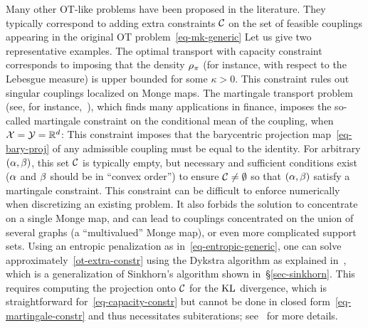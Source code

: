 Many other OT-like problems have been proposed in the literature. They typically correspond to adding extra constraints $\mathcal{C}$ on the set of feasible couplings appearing in the original OT problem~\eqref{eq-mk-generic}
Let us give two representative examples.
%
The optimal transport with capacity constraint~\citep{km1} corresponds to imposing that the density $\rho_{\pi}$ (for instance, with respect to the Lebesgue measure) is upper bounded
\eql{\label{eq-capacity-constr}
	\Cc = \enscond{ \pi }{ \density{\pi} \leq \kappa }
}
for some $\kappa>0$. This constraint rules out singular couplings localized on Monge maps. 
%
The martingale transport problem (see, for instance,~\citet{GalichonMartingale,dolinsky2014martingale,TanTouzi,beiglbock2013model}), which finds many applications in finance, imposes the so-called martingale constraint on the conditional mean of the coupling, when $\mathcal{X}=\mathcal{Y}=\mathbb{R}^d$:
This constraint imposes that the barycentric projection map~\eqref{eq-bary-proj} of any admissible coupling must be equal to the identity.
%
For arbitrary $(\alpha,\beta)$, this set $\mathcal{C}$ is typically empty, but necessary and sufficient conditions exist ($\alpha$ and $\beta$ should be in ``convex order'') to ensure $\mathcal{C} \neq \emptyset$ so that  $(\alpha,\beta)$ satisfy a martingale constraint. This constraint can be difficult to enforce numerically when discretizing an existing problem.
%
It also forbids the solution to concentrate on a single Monge map, and can lead to couplings concentrated on the union of several graphs (a ``multivalued'' Monge map), or even more complicated support sets.
%
Using an entropic penalization as in~\eqref{eq-entropic-generic}, one can solve approximately~\eqref{ot-extra-constr} using the Dykstra algorithm as explained in~\citet{2015-benamou-cisc}, which is a generalization of Sinkhorn's algorithm shown in~\S\ref{sec-sinkhorn}. This requires computing the projection onto $\mathcal{C}$ for the $\operatorname{KL}$ divergence, which is straightforward for~\eqref{eq-capacity-constr} but cannot be done in closed form~\eqref{eq-martingale-constr} and thus necessitates subiterations; see~\citep{guo2017computational} for more details.


